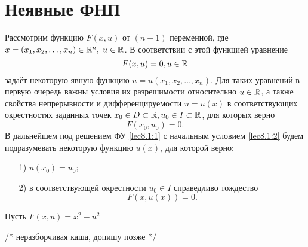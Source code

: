 \documentclass[../../main.tex]{subfiles}
\begin{document}
	\section{Неявные ФНП}

	Рассмотрим функцию $F(x, u)$ от $(n+1)$ переменной, где $x = (x_1, x_2, \ldots,
	 x_n) \in \mathbb{R}^n, \; u \in \mathbb{R}$. В соответствии с этой функцией уравнение
	 \begin{equation}
		F(x,u) = 0, u \in \mathbb{R} \label{lec8.1:1}
	 \end{equation}
	 задаёт некоторую явную функцию $u = u(x_1, x_2, \ldots, x_n)$. Для таких 
	 уравнений в первую очередь важны условия их разрешимости относительно 
	 $u \in \mathbb{R}$, а также свойства непрерывности и дифференцируемости $u = u(x)$ в 
	 соответствующих окрестностях заданных точек $x_0 \in D \subset \mathbb{R}, u_0 \in I  
	 \subset \mathbb{R}$, для которых верно
	 \begin{equation}
		F(x_0, u_0) = 0. \label{lec8.1:2}
	 \end{equation}
	 В дальнейшем под решением ФУ \eqref{lec8.1:1} с начальным условием 
	 \eqref{lec8.1:2} будем подразумевать некоторую функцию $u(x)$, для которой 
	 верно: 
	 \begin{itemize}
	 	\item[1)] $u(x_0) = u_0$;
	 	\item[2)] в соответствующей окрестности $u_0 \in I$ справедливо тождество
		\begin{equation}
			F(x, u(x)) = 0. \label{lec8.1:3}
		\end{equation}
	 \end{itemize}
	 \begin{exmp}
		Пусть $F(x, u) = x^2 - u^2$

		/* неразборчивая каша, допишу позже */
	 \end{exmp}
\end{document}
